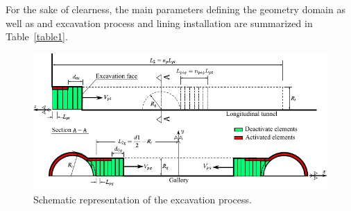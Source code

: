\documentclass[Journal,letterpaper, NoLists,SectionNumbers]{ascelike-new}
\begin{document}
For the sake of clearness, the main parameters defining the geometry domain as well as and excavation process and lining installation are summarized in Table~\ref{table1}. 
\begin{figure}[h!]
	\centering
	\includegraphics[scale=1.3]{Diagram of excavations.pdf}
	\caption{Schematic representation of the excavation process.}
	\label{Diagram of excavations}
\end{figure}
\end{document}
